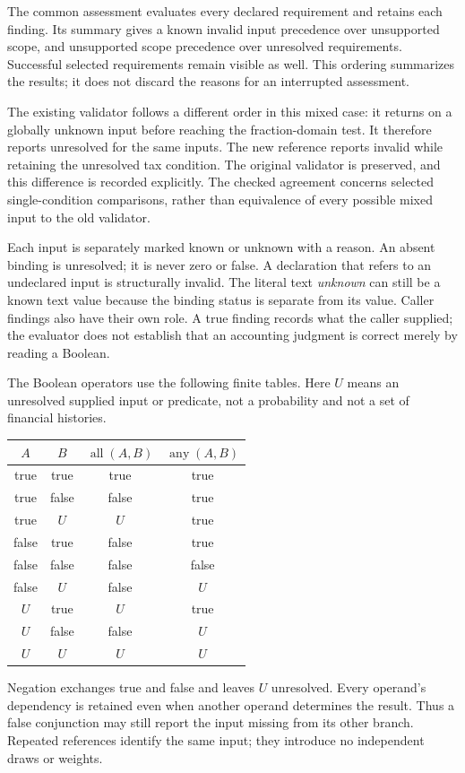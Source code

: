 The common assessment evaluates every declared requirement and retains each
finding. Its summary gives a known invalid input precedence over unsupported
scope, and unsupported scope precedence over unresolved requirements. Successful
selected requirements remain visible as well. This ordering summarizes the
results; it does not discard the reasons for an interrupted assessment.

The existing  validator follows a different order
in this mixed case: it returns on a globally unknown input before reaching the
fraction-domain test. It therefore reports unresolved for the same inputs.
The new reference reports invalid while retaining the unresolved tax condition.
The original validator is preserved, and this difference is recorded explicitly.
The checked agreement concerns selected single-condition comparisons, rather
than equivalence of every possible mixed input to the old validator.

Each input is separately marked known or unknown with a reason. An absent
binding is unresolved; it is never zero or false. A declaration that refers to
an undeclared input is structurally invalid. The literal text \emph{unknown} can
still be a known text value because the binding status is separate from its
value. Caller findings also have their own role. A true finding records what
the caller supplied; the evaluator does not establish that an accounting
judgment is correct merely by reading a Boolean.

The Boolean operators use the following finite tables. Here $U$ means an
unresolved supplied input or predicate, not a probability and not a set of
financial histories.
\begin{center}
\begin{tabular}{cc|cc}
$A$ & $B$ & $\operatorname{all}(A,B)$ & $\operatorname{any}(A,B)$ \\
\hline
true & true & true & true \\
true & false & false & true \\
true & $U$ & $U$ & true \\
false & true & false & true \\
false & false & false & false \\
false & $U$ & false & $U$ \\
$U$ & true & $U$ & true \\
$U$ & false & false & $U$ \\
$U$ & $U$ & $U$ & $U$
\end{tabular}
\end{center}
Negation exchanges true and false and leaves $U$ unresolved. Every operand's
dependency is retained even when another operand determines the result. Thus a
false conjunction may still report the input missing from its other branch.
Repeated references identify the same input; they introduce no independent
draws or weights.

